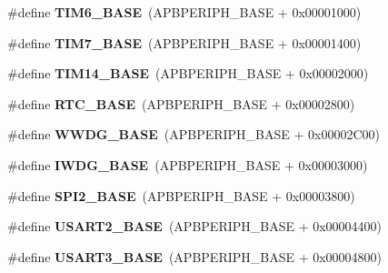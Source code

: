 \begin{DoxyCompactItemize}
\#define {\bfseries T\+I\+M6\+\_\+\+B\+A\+SE}~(A\+P\+B\+P\+E\+R\+I\+P\+H\+\_\+\+B\+A\+SE + 0x00001000)
\item 
\mbox{\label{group___peripheral__memory__map_ga0ebf54364c6a2be6eb19ded6b18b6387}} 
\#define {\bfseries T\+I\+M7\+\_\+\+B\+A\+SE}~(A\+P\+B\+P\+E\+R\+I\+P\+H\+\_\+\+B\+A\+SE + 0x00001400)
\item 
\mbox{\label{group___peripheral__memory__map_ga862855347d6e1d92730dfe17ee8e90b8}} 
\#define {\bfseries T\+I\+M14\+\_\+\+B\+A\+SE}~(A\+P\+B\+P\+E\+R\+I\+P\+H\+\_\+\+B\+A\+SE + 0x00002000)
\item 
\mbox{\label{group___peripheral__memory__map_ga4265e665d56225412e57a61d87417022}} 
\#define {\bfseries R\+T\+C\+\_\+\+B\+A\+SE}~(A\+P\+B\+P\+E\+R\+I\+P\+H\+\_\+\+B\+A\+SE + 0x00002800)
\item 
\mbox{\label{group___peripheral__memory__map_ga9a5bf4728ab93dea5b569f5b972cbe62}} 
\#define {\bfseries W\+W\+D\+G\+\_\+\+B\+A\+SE}~(A\+P\+B\+P\+E\+R\+I\+P\+H\+\_\+\+B\+A\+SE + 0x00002\+C00)
\item 
\mbox{\label{group___peripheral__memory__map_ga8543ee4997296af5536b007cd4748f55}} 
\#define {\bfseries I\+W\+D\+G\+\_\+\+B\+A\+SE}~(A\+P\+B\+P\+E\+R\+I\+P\+H\+\_\+\+B\+A\+SE + 0x00003000)
\item 
\mbox{\label{group___peripheral__memory__map_gac3e357b4c25106ed375fb1affab6bb86}} 
\#define {\bfseries S\+P\+I2\+\_\+\+B\+A\+SE}~(A\+P\+B\+P\+E\+R\+I\+P\+H\+\_\+\+B\+A\+SE + 0x00003800)
\item 
\mbox{\label{group___peripheral__memory__map_gade83162a04bca0b15b39018a8e8ec090}} 
\#define {\bfseries U\+S\+A\+R\+T2\+\_\+\+B\+A\+SE}~(A\+P\+B\+P\+E\+R\+I\+P\+H\+\_\+\+B\+A\+SE + 0x00004400)
\item 
\mbox{\label{group___peripheral__memory__map_gabe0d6539ac0026d598274ee7f45b0251}} 
\#define {\bfseries U\+S\+A\+R\+T3\+\_\+\+B\+A\+SE}~(A\+P\+B\+P\+E\+R\+I\+P\+H\+\_\+\+B\+A\+SE + 0x00004800)

\end{DoxyCompactItemize}
